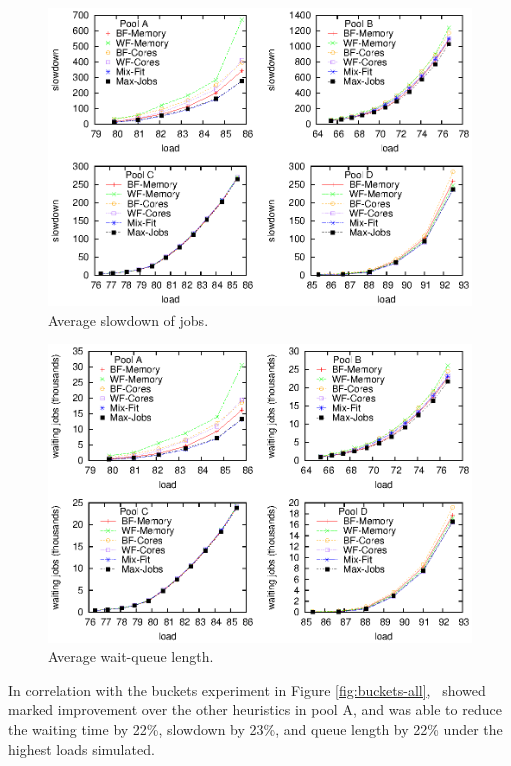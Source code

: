 \begin{figure}\centering
	\includegraphics[width=1.0\textwidth]{figures/avg-slowdown-with-max-jobs.eps}
\caption{Average slowdown of jobs.}
\label{fig:avg-slowdown-with-max-jobs}
\end{figure}

\begin{figure}\centering
	\includegraphics[width=1.0\textwidth]{figures/avg-waitqueue-with-max-jobs.eps}
\caption{Average wait-queue length.}
\label{fig:avg-waitqueue-with-max-jobs}
\end{figure}

In correlation with the buckets experiment in Figure \ref{fig:buckets-all}, 
\mif\ showed marked improvement over the other heuristics in pool A, 
and was able to reduce the waiting time by 22\%, slowdown by 23\%, and queue
length by 22\% under the highest loads simulated.


